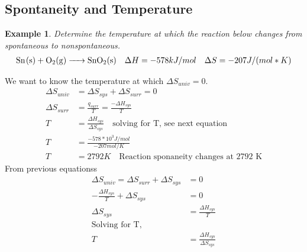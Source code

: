 \documentclass{article}  %
\newtheorem{exmp}{Example}
\begin{document}
\subsection*{Spontaneity and Temperature}
\begin{exmp}
    Determine the temperature at which the reaction below changes from spontaneous to nonspontaneous.
    \begin{equation*}
        \begin{aligned}
            \ce{Sn_(s) + O2_(g) -> SnO2_(s)} \quad \Delta H = -578 kJ/mol \quad \Delta S = -207 J/(mol*K)
        \end{aligned}
    \end{equation*}
\end{exmp}
We want to know the temperature at which $\Delta S_{univ} = 0$.
\begin{equation}
    \begin{aligned}
        \Delta S_{univ} &= \Delta S_{sys} + \Delta S_{surr} = 0  \\
        \Delta S_{surr} &= \frac{q_{surr}}{T} =\frac{- \Delta H_{sys}}{T} \\
        T &= \frac{\Delta H_{sys}}{\Delta S_{sys}} \quad \text{solving for T, see next equation}\\
        T &= \frac{-578*10^3 J/mol}{-207 mol/K} \\
        T &= 2792 K \quad \text{Reaction sponaneity changes at 2792 K}
    \end{aligned}
\end{equation}
From previous equationss
\begin{equation}
    \begin{aligned}
        \Delta S_{univ} = \Delta S_{surr} + \Delta S_{sys} &= 0\\
        -\frac{\Delta H_{sys}}{T} + \Delta S_{sys} &= 0 \\
        \Delta S_{sys} &= \frac{\Delta H_{sys}}{T} \\
        \text{Solving for T,} \\
        T &= \frac{\Delta H_{sys}}{\Delta S_{sys}}
    \end{aligned}
\end{equation}
\end{document}
